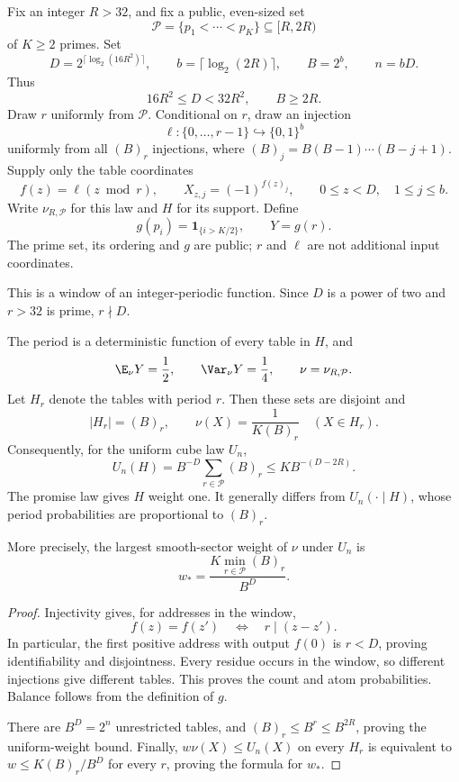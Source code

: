 \begin{definition}\label{ian:period-hsp-period-law}
Fix an integer \(R>32\), and fix a public, even-sized set
\[
 \mathcal P=\{p_1<\cdots<p_K\}\subseteq[R,2R)
\]
of \(K\ge2\) primes. Set
\[
 D=2^{\lceil\log_2(16R^2)\rceil},\qquad
 b=\lceil\log_2(2R)\rceil,\qquad B=2^b,\qquad n=bD.
\]
Thus
\[
 16R^2\le D<32R^2,\qquad B\ge2R.
\]
Draw \(r\) uniformly from \(\mathcal P\). Conditional on \(r\), draw an injection
\[
 \ell:\{0,\ldots,r-1\}\hookrightarrow\{0,1\}^b
\]
uniformly from all \((B)_r\) injections, where
\((B)_j=B(B-1)\cdots(B-j+1)\).
Supply only the table coordinates
\[
 f(z)=\ell(z\bmod r),\qquad
 X_{z,j}=(-1)^{f(z)_j},
 \qquad 0\le z<D,\quad 1\le j\le b.
\]
Write \(\nu_{R,\mathcal P}\) for this law and \(H\) for its support. Define
\[
 g(p_i)=\mathbf1_{\{i>K/2\}},\qquad Y=g(r).
\]
The prime set, its ordering and \(g\) are public; \(r\) and \(\ell\) are not additional input coordinates.

This is a window of an integer-periodic function. Since \(D\) is a power of two and \(r>32\) is prime, \(r\nmid D\).
\end{definition}

\begin{lemma}\label{ian:period-hsp-period-weight}
The period is a deterministic function of every table in \(H\), and
\[
 \E_\nu Y=\frac12,\qquad \Var_\nu Y=\frac14,
 \qquad \nu=\nu_{R,\mathcal P}.
\]
Let \(H_r\) denote the tables with period \(r\). Then these sets are disjoint and
\[
 |H_r|=(B)_r,\qquad
 \nu(X)=\frac1{K(B)_r}\quad(X\in H_r).
\]
Consequently, for the uniform cube law \(U_n\),
\[
 U_n(H)=B^{-D}\sum_{r\in\mathcal P}(B)_r
 \le K B^{-(D-2R)}.
 \tag{31.1}\label{ian:period-hsp-uniform-weight}
\]
The promise law gives \(H\) weight one. It generally differs from \(U_n(\cdot\mid H)\), whose period probabilities are proportional to \((B)_r\).

More precisely, the largest smooth-sector weight of \(\nu\) under \(U_n\) is
\[
 w_*=\frac{K\min_{r\in\mathcal P}(B)_r}{B^D}.
 \tag{31.2}\label{ian:period-hsp-uniform-smooth-weight}
\]
\end{lemma}

\begin{proof}
Injectivity gives, for addresses in the window,
\[
 f(z)=f(z')\quad\Longleftrightarrow\quad r\mid(z-z').
\]
In particular, the first positive address with output \(f(0)\) is \(r<D\), proving identifiability and disjointness. Every residue occurs in the window, so different injections give different tables. This proves the count and atom probabilities. Balance follows from the definition of \(g\).

There are \(B^D=2^n\) unrestricted tables, and
\((B)_r\le B^r\le B^{2R}\), proving the uniform-weight bound.
Finally, \(w\nu(X)\le U_n(X)\) on every \(H_r\) is equivalent to
\(w\le K(B)_r/B^D\) for every \(r\), proving the formula for \(w_*\).
\end{proof}

